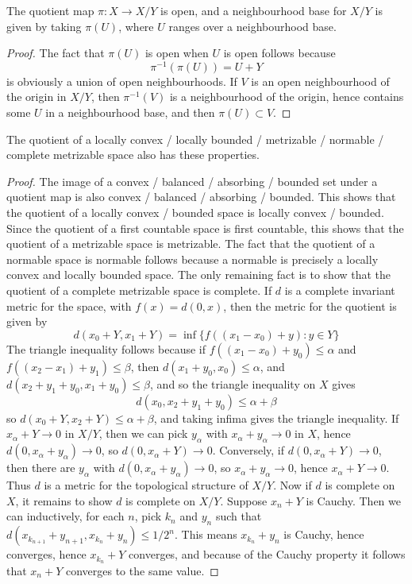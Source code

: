\begin{theorem}
    The quotient map $\pi: X \to X/Y$ is open, and a neighbourhood base for $X/Y$ is given by taking $\pi(U)$, where $U$ ranges over a neighbourhood base.
\end{theorem}
\begin{proof}
    The fact that $\pi(U)$ is open when $U$ is open follows because
    \[ \pi^{-1}(\pi(U)) = U + Y \]
    is obviously a union of open neighbourhoods. If $V$ is an open neighbourhood of the origin in $X/Y$, then $\pi^{-1}(V)$ is a neighbourhood of the origin, hence contains some $U$ in a neighbourhood base, and then $\pi(U) \subset V$.
\end{proof}

\begin{theorem}
    The quotient of a locally convex / locally bounded / metrizable / normable / complete metrizable space also has these properties.
\end{theorem}
\begin{proof}
    The image of a convex / balanced / absorbing / bounded set under a quotient map is also convex / balanced / absorbing / bounded. This shows that the quotient of a locally convex / bounded space is locally convex / bounded. Since the quotient of a first countable space is first countable, this shows that the quotient of a metrizable space is metrizable. The fact that the quotient of a normable space is normable follows because a normable is precisely a locally convex and locally bounded space. The only remaining fact is to show that the quotient of a complete metrizable space is complete. If $d$ is a complete invariant metric for the space, with $f(x) = d(0,x)$, then the metric for the quotient is given by
    \[ d(x_0 + Y, x_1 + Y) = \inf \{ f((x_1 - x_0) + y) : y \in Y \} \]
    The triangle inequality follows because if $f((x_1 - x_0) + y_0) \leq \alpha$ and $f((x_2 - x_1) + y_1) \leq \beta$, then $d(x_1 + y_0, x_0) \leq \alpha$, and $d(x_2 + y_1 + y_0, x_1 + y_0) \leq \beta$, and so the triangle inequality on $X$ gives
    \[ d(x_0, x_2 + y_1 + y_0) \leq \alpha + \beta \]
    so $d(x_0 + Y, x_2 + Y) \leq \alpha + \beta$, and taking infima gives the triangle inequality. If $x_\alpha + Y \to 0$ in $X/Y$, then we can pick $y_\alpha$ with $x_\alpha + y_\alpha \to 0$ in $X$, hence $d(0, x_\alpha + y_\alpha) \to 0$, so $d(0,x_\alpha + Y) \to 0$. Conversely, if $d(0,x_\alpha + Y) \to 0$, then there are $y_\alpha$ with $d(0, x_\alpha + y_\alpha) \to 0$, so $x_\alpha + y_\alpha \to 0$, hence $x_\alpha + Y \to 0$. Thus $d$ is a metric for the topological structure of $X/Y$. Now if $d$ is complete on $X$, it remains to show $d$ is complete on $X/Y$. Suppose $x_n + Y$ is Cauchy. Then we can inductively, for each $n$, pick $k_n$ and $y_n$ such that $d(x_{k_{n+1}} + y_{n+1}, x_{k_n} + y_n) \leq 1/2^n$. This means $x_{k_n} + y_n$ is Cauchy, hence converges, hence $x_{k_n} + Y$ converges, and because of the Cauchy property it follows that $x_n + Y$ converges to the same value.
\end{proof}

